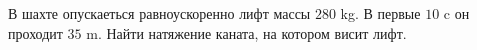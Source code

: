 В шахте опускаеться равноускоренно лифт массы $280$ kg. В первые $10$ c
он проходит $35$ m. Найти натяжение каната, на котором висит лифт.

